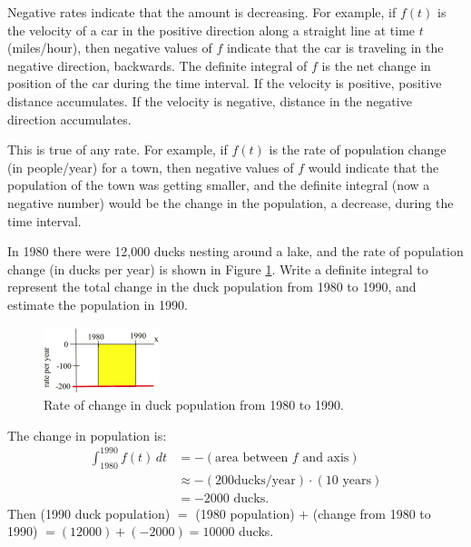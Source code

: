 Negative rates indicate that the amount is decreasing. For example, if $f(t)$ is the velocity of a car in the positive direction along a straight line at time $t$ (miles/hour), then negative values of $f$ indicate that the car is traveling in the negative direction, backwards. The definite integral of $f$ is the net change in position of the car during the time interval. If the velocity is positive, positive distance accumulates. If the velocity is negative, distance in the negative direction accumulates.

This is true of any rate. For example, if $f(t)$ is the rate of population change (in people/year) for a town, then negative values of $f$ would indicate that the population of the town was getting smaller, and the definite integral (now a negative number) would be the change in the population, a decrease, during the time interval.

\begin{example}
In 1980 there were 12,000 ducks nesting around a lake, and the rate of population change (in ducks per year) is shown in Figure \ref{fig:5-3-ducks}. Write a definite integral to represent the total change in the duck population from 1980 to 1990, and estimate the population in 1990.

\begin{figure}[!ht]
  \centering
    \includegraphics[width=0.3\textwidth]{img/chap5/image013.png}
    \caption{Rate of change in duck population from 1980 to 1990.}
    \label{fig:5-3-ducks}
\end{figure}

\begin{solution}
The change in population is:
\begin{align*}
  \int_{1980}^{1990}f(t)\,dt &= -(\text{area between }f\text{ and axis}) \\
    &\approx   -(200 \text{ducks/year})\cdot(10\text{ years})\\
    &= -2000\text{ ducks.}
  \end{align*}
Then (1990 duck population) $=$ (1980 population) $+$ (change from 1980 to 1990) $= (12000) + (-2000) = 10000$ ducks.
\end{solution}\end{example}

